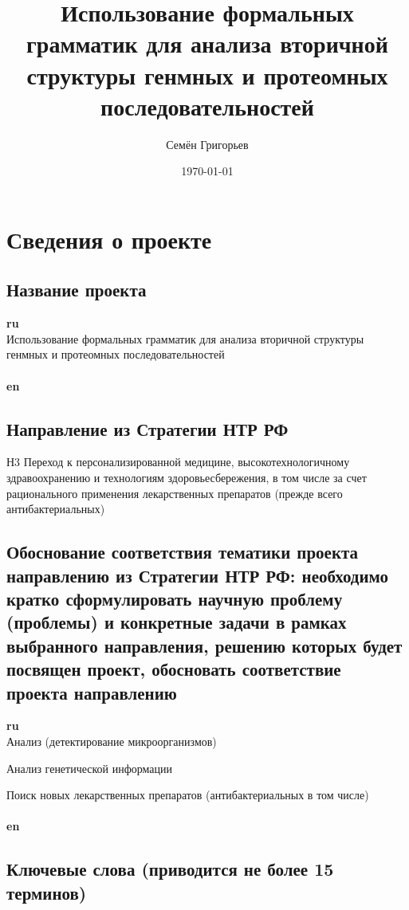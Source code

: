 \documentclass[12pt]{article}  %
\title{Использование формальных грамматик для анализа вторичной структуры генмных и протеомных  последовательностей}
\author{Семён Григорьев}
\date{\today}
\theoremstyle{remark}
\begin{document}

\maketitle

\section{Сведения о проекте}

\subsection{Название проекта}

\textbf{ru}\\
Использование формальных грамматик для анализа вторичной структуры генмных и протеомных  последовательностей
\\
\\
\textbf{en}\\

\subsection{Направление из Стратегии НТР РФ}

Н3 Переход к персонализированной медицине, высокотехнологичному здравоохранению и технологиям здоровьесбережения, в том числе за счет рационального применения лекарственных препаратов (прежде всего антибактериальных)

\subsection{Обоснование соответствия тематики проекта направлению из Стратегии НТР РФ: необходимо кратко сформулировать научную проблему (проблемы) и конкретные задачи в рамках выбранного направления, решению которых будет посвящен проект, обосновать соответствие проекта направлению}
\textbf{ru}\\
Анализ (детектирование микроорганизмов)

Анализ генетической информации

Поиск новых лекарственных препаратов (антибактериальных в том числе)
\\
\\
\textbf{en}\\


\subsection{Ключевые слова (приводится не более 15 терминов)}
\end{document}
